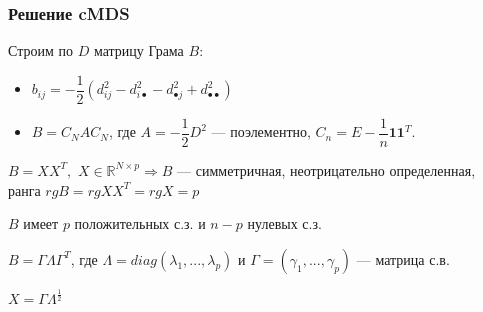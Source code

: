\documentclass[10pt]{beamer}
\newcommand{\real}{\mathbb{R}}
\begin{document}
\begin{frame}
\frametitle{Решение cMDS}


Строим по $D$ матрицу Грама $B$:

\begin{itemize}
\item{$b_{ij} = -\dfrac{1}{2}(d_{ij}^2 - d_{i \bullet}^2 - d_{\bullet j}^2 + d_{\bullet \bullet}^2)$}
\item{$B = C_N A C_N$, где $A = -\dfrac{1}{2} D^2$ --- поэлементно, $C_n = E - \dfrac{1}{n} \textbf{1} \textbf{1}^T$.}
\end{itemize}

\vspace{\baselineskip}
$B = XX^T,$ $X \in \real^{N \times p} \Rightarrow B$ --- симметричная, неотрицательно определенная, ранга $rg{B} = rg{XX^T} = rg{X} = p$

$B$ имеет $p$ положительных с.з. и $n-p$ нулевых с.з.

$B = \Gamma \Lambda \Gamma^T$, где $\Lambda = diag(\lambda_1, ..., \lambda_p)$ и $\Gamma = (\gamma_1, ..., \gamma_p)$ --- матрица с.в.

\vspace{\baselineskip}
\begin{center}
$X = \Gamma \Lambda^{\frac{1}{2}}$ 
\end{center}

\end{frame}
\end{document}
